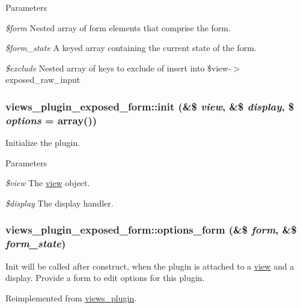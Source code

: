 \begin{DoxyParams}{Parameters}
\item[{\em \$form}]Nested array of form elements that comprise the form. \item[{\em \$form\_\-state}]A keyed array containing the current state of the form. \item[{\em \$exclude}]Nested array of keys to exclude of insert into \$view-\/$>$exposed\_\-raw\_\-input \end{DoxyParams}
\hypertarget{classviews__plugin__exposed__form_a904dfe8240f8b8c26fe70422ccc7d2b4}{
\subsubsection[{init}]{\setlength{\rightskip}{0pt plus 5cm}views\_\-plugin\_\-exposed\_\-form::init (\&\$ {\em view}, \/  \&\$ {\em display}, \/  \$ {\em options} = {\ttfamily array()})}}
\label{classviews__plugin__exposed__form_a904dfe8240f8b8c26fe70422ccc7d2b4}
Initialize the plugin.


\begin{DoxyParams}{Parameters}
\item[{\em \$view}]The \hyperlink{classview}{view} object. \item[{\em \$display}]The display handler. \end{DoxyParams}
\hypertarget{classviews__plugin__exposed__form_a546ecbe4ca1989a9e60a6228d0b8fb15}{
\subsubsection[{options\_\-form}]{\setlength{\rightskip}{0pt plus 5cm}views\_\-plugin\_\-exposed\_\-form::options\_\-form (\&\$ {\em form}, \/  \&\$ {\em form\_\-state})}}
\label{classviews__plugin__exposed__form_a546ecbe4ca1989a9e60a6228d0b8fb15}
Init will be called after construct, when the plugin is attached to a \hyperlink{classview}{view} and a display. Provide a form to edit options for this plugin. 

Reimplemented from \hyperlink{classviews__plugin_a1aaed8da1afd9f45293a37358c159837}{views\_\-plugin}.


